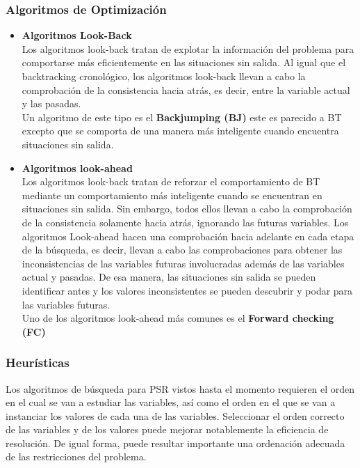 \documentclass[a4paper]{article}
\begin{document}
\subsubsection{Algoritmos de Optimización}
\begin{itemize}
\item \textbf{Algoritmos Look-Back}\\
Los algoritmos look-back tratan de explotar la información del problema para comportarse más eficientemente en las situaciones sin salida. Al igual que el backtracking cronológico, los algoritmos look-back llevan a cabo la comprobación de la consistencia hacia atrás, es decir, entre la variable actual y las pasadas.\\
Un algoritmo de este tipo es el \textbf{Backjumping (BJ)} este es parecido a BT excepto que se comporta de una manera más inteligente cuando encuentra situaciones sin salida.

\item \textbf{Algoritmos look-ahead}\\
Los algoritmos look-back tratan de reforzar el comportamiento de BT mediante un comportamiento más inteligente cuando se encuentran en situaciones sin salida. Sin embargo, todos ellos llevan a cabo la comprobación de la consistencia solamente hacia atrás, ignorando las futuras variables. Los algoritmos Look-ahead hacen una comprobación hacia adelante en cada etapa de la búsqueda, es decir, llevan a cabo las comprobaciones para obtener las inconsistencias de las variables futuras involucradas además de las variables actual y pasadas. De esa manera, las situaciones sin salida se pueden identificar antes y los valores inconsistentes se pueden descubrir y podar para las variables futuras.\\
Uno de los algoritmos look-ahead más comunes es el \textbf{Forward checking (FC)} 

\end{itemize}

\subsubsection{Heurísticas}
Los algoritmos de búsqueda para PSR vistos hasta el momento requieren el orden en el cual se van a estudiar las variables, así como el orden en el que se van a instanciar los valores de cada una de las variables. Seleccionar el orden correcto de las variables y de los valores puede mejorar notablemente la eficiencia de resolución. De igual forma, puede resultar importante una ordenación adecuada de las restricciones del problema.
\end{document}
